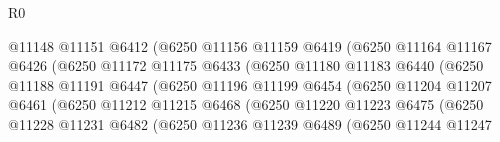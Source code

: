 \begin{lexlean}{R0}
\begin{coremodule}
                                  @11148
                                  @11151
                                  @6412
                                  (@6250
                                    @11156
                                    @11159
                                    @6419
                                    (@6250
                                      @11164
                                      @11167
                                      @6426
                                      (@6250
                                        @11172
                                        @11175
                                        @6433
                                        (@6250
                                          @11180
                                          @11183
                                          @6440
                                          (@6250
                                            @11188
                                            @11191
                                            @6447
                                            (@6250
                                              @11196
                                              @11199
                                              @6454
                                              (@6250
                                                @11204
                                                @11207
                                                @6461
                                                (@6250
                                                  @11212
                                                  @11215
                                                  @6468
                                                  (@6250
                                                    @11220
                                                    @11223
                                                    @6475
                                                    (@6250
                                                      @11228
                                                      @11231
                                                      @6482
                                                      (@6250
                                                        @11236
                                                        @11239
                                                        @6489
                                                        (@6250
                                                          @11244
                                                          @11247

\end{coremodule}
\end{lexlean}
